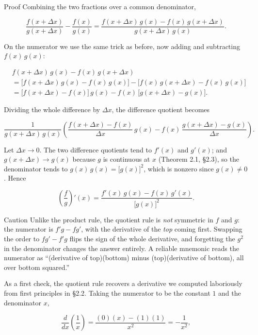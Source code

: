 \documentclass[a4paper,12pt,oneside]{memoir}
\begin{document}
\begin{envproof}{Proof}{}{}
Combining the two fractions over a common denominator,

\[ \frac{f(x+\Delta x)}{g(x+\Delta x)} - \frac{f(x)}{g(x)} = \frac{f(x+\Delta x)\,g(x) - f(x)\,g(x+\Delta x)}{g(x+\Delta x)\,g(x)}. \]

On the numerator we use the same trick as before, now adding and subtracting \(f(x)\,g(x)\):

\[ \begin{aligned}
        &f(x+\Delta x)\,g(x) - f(x)\,g(x+\Delta x) \\[2pt]
        &= \bigl[f(x+\Delta x)\,g(x) - f(x)\,g(x)\bigr] - \bigl[f(x)\,g(x+\Delta x) - f(x)\,g(x)\bigr] \\[2pt]
        &= \bigl[f(x+\Delta x) - f(x)\bigr]\,g(x) - f(x)\,\bigl[g(x+\Delta x) - g(x)\bigr].
      \end{aligned} \]

Dividing the whole difference by \(\Delta x\), the difference quotient becomes

\[ \frac{1}{g(x+\Delta x)\,g(x)}\left( \frac{f(x+\Delta x) - f(x)}{\Delta x}\,g(x) - f(x)\,\frac{g(x+\Delta x) - g(x)}{\Delta x} \right). \]

Let \(\Delta x \to 0\). The two difference quotients tend to \(f'(x)\) and \(g'(x)\); and \(g(x+\Delta x) \to g(x)\) because \(g\) is continuous at \(x\) (Theorem 2.1, §2.3), so the denominator tends to \(g(x)\,g(x) = \bigl[g(x)\bigr]^{2}\), which is nonzero since \(g(x) \ne 0\). Hence

\[ \left(\frac{f}{g}\right)'(x) = \frac{f'(x)\,g(x) - f(x)\,g'(x)}{\bigl[g(x)\bigr]^{2}}. \]
\end{envproof}
\begin{envcaution}{Caution}{}{}
Unlike the product rule, the quotient rule is \emph{not} symmetric in \(f\) and \(g\): the numerator is \(f'g - f g'\), with the derivative of the \emph{top} coming first. Swapping the order to \(f g' - f' g\) flips the sign of the whole derivative, and forgetting the \(g^{2}\) in the denominator changes the answer entirely. A reliable mnemonic reads the numerator as “(derivative of top)(bottom) minus (top)(derivative of bottom), all over bottom squared.”
\end{envcaution}
As a first check, the quotient rule recovers a derivative we computed laboriously from first principles in §2.2. Taking the numerator to be the constant \(1\) and the denominator \(x\),

\[ \frac{d}{dx}\!\left(\frac{1}{x}\right) = \frac{(0)(x) - (1)(1)}{x^{2}} = -\frac{1}{x^{2}}, \]
\end{document}

